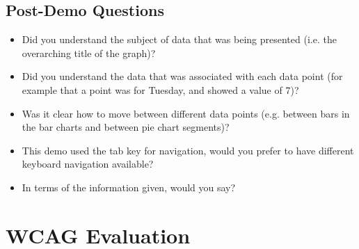 \documentclass[ %
                    author={Aleena Baig},
                supervisor={Dr Simon Lock},
                    degree={BSc},
                     title={On Making Web Accessible Graphs},
                  subtitle={},
                      year={2019} ]{dissertation}
\begin{document}
\section{Post-Demo Questions}

\begin{itemize}
    \item Did you understand the subject of data that was being presented (i.e. the overarching title of the graph)? 
    \item Did you understand the data that was associated with each data point (for example that a point was for Tuesday, and showed a value of 7)? 
    \item Was it clear how to move between different data points (e.g. between bars in the bar charts and between pie chart segments)? 
    \item This demo used the tab key for navigation, would you prefer to have different keyboard navigation available? 
    \item In terms of the information given, would you say? \newline [The right amount of information was given, Too much information given, Too little information was given
    \item Any other thoughts? [Text field for participant to answer]
\end{itemize}


\chapter{WCAG Evaluation}
\label{appendix:wcagevaluation}
\end{document}
